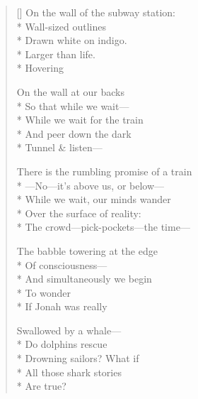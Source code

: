 \label{ch:dolphins_eels_sea_turtles}
\begin{verse}[\versewidth]
\hspace*{1\vgap} On the wall of the subway station:\\*
Wall-sized outlines\\*
Drawn white on indigo.\\*
Larger than life.\\*
Hovering

On the wall at our backs\\*
So that while we wait---\\*
While we wait for the train\\*
And peer down the dark\\*
Tunnel \& listen---

There is the rumbling promise of a train\\*
---No---it's above us, or below---\\*
While we wait, our minds wander\\*
Over the surface of reality:\\*
The crowd---pick-pockets---the time---

The babble towering at the edge\\*
Of consciousness---\\*
And simultaneously we begin\\*
To wonder\\*
If Jonah was really

Swallowed by a whale---\\*
Do dolphins rescue\\*
Drowning sailors?     What if\\*
All those shark stories\\*
Are true?
\end{verse}
